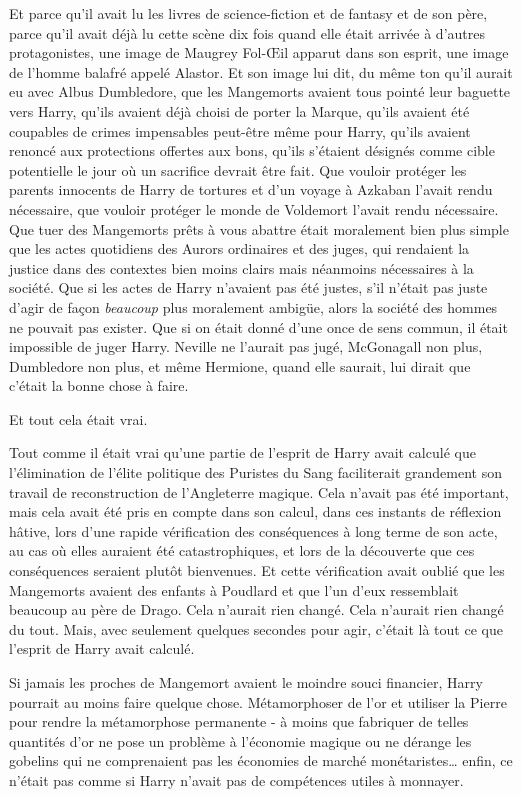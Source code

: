 Et parce qu'il avait lu les livres de science-fiction et de fantasy et de son père, parce qu'il avait déjà lu cette scène dix fois quand elle était arrivée à d'autres protagonistes, une image de Maugrey Fol-Œil apparut dans son esprit, une image de l'homme balafré appelé Alastor. Et son image lui dit, du même ton qu'il aurait eu avec Albus Dumbledore, que les Mangemorts avaient tous pointé leur baguette vers Harry, qu'ils avaient déjà choisi de porter la Marque, qu'ils avaient été coupables de crimes impensables peut-être même pour Harry, qu'ils avaient renoncé aux protections offertes aux bons, qu'ils s'étaient désignés comme cible potentielle le jour où un sacrifice devrait être fait. Que vouloir protéger les parents innocents de Harry de tortures et d'un voyage à Azkaban l'avait rendu nécessaire, que vouloir protéger le monde de Voldemort l'avait rendu nécessaire. Que tuer des Mangemorts prêts à vous abattre était moralement bien plus simple que les actes quotidiens des Aurors ordinaires et des juges, qui rendaient la justice dans des contextes bien moins clairs mais néanmoins nécessaires à la société. Que si les actes de Harry n'avaient pas été justes, s'il n'était pas juste d'agir de façon \emph{beaucoup} plus moralement ambigüe, alors la société des hommes ne pouvait pas exister. Que si on était donné d'une once de sens commun, il était impossible de juger Harry. Neville ne l'aurait pas jugé, McGonagall non plus, Dumbledore non plus, et même Hermione, quand elle saurait, lui dirait que c'était la bonne chose à faire.

Et tout cela était vrai.

Tout comme il était vrai qu'une partie de l'esprit de Harry avait calculé que l'élimination de l'élite politique des Puristes du Sang faciliterait grandement son travail de reconstruction de l'Angleterre magique. Cela n'avait pas été important, mais cela avait été pris en compte dans son calcul, dans ces instants de réflexion hâtive, lors d'une rapide vérification des conséquences à long terme de son acte, au cas où elles auraient été catastrophiques, et lors de la découverte que ces conséquences seraient plutôt bienvenues. Et cette vérification avait oublié que les Mangemorts avaient des enfants à Poudlard et que l'un d'eux ressemblait beaucoup au père de Drago. Cela n'aurait rien changé. Cela n'aurait rien changé du tout. Mais, avec seulement quelques secondes pour agir, c'était là tout ce que l'esprit de Harry avait calculé.

Si jamais les proches de Mangemort avaient le moindre souci financier, Harry pourrait au moins faire quelque chose. Métamorphoser de l'or et utiliser la Pierre pour rendre la métamorphose permanente - à moins que fabriquer de telles quantités d'or ne pose un problème à l'économie magique ou ne dérange les gobelins qui ne comprenaient pas les économies de marché monétaristes… enfin, ce n'était pas comme si Harry n'avait pas de compétences utiles à monnayer.

